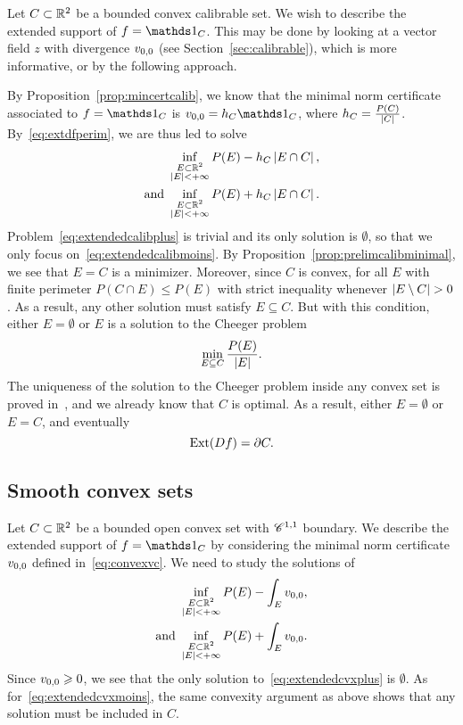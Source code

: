 Let $C\subset \mathbb{R}^2$ be a bounded convex calibrable set. We wish to describe the extended support of $f=\bun{C}$. This may be done by looking at a vector field $z$ with divergence  $v_{0,0}$ (see Section~\ref{sec:calibrable}), which is more informative, or by the following approach.

By Proposition~\ref{prop:mincertcalib}, we know that the minimal norm certificate associated to $f=\bun{C}$ is $\voo=h_C\bun{C}$, where $h_C=\frac{P(C)}{\left| C \right|}$. By~\eqref{eq:extdfperim}, we are thus led to solve
\begin{align}
  \label{eq:extendedcalibmoins}   \inf_{\substack{E\subset\mathbb{R}^2\\\left| E \right|<+\infty}} P(E)-h_C \left| E\cap C \right|,\\
  \label{eq:extendedcalibplus}  \mbox{and } \inf_{\substack{E\subset\mathbb{R}^2\\\left| E \right|<+\infty}} P(E)+h_C \left| E\cap C \right|.
\end{align}
Problem~\eqref{eq:extendedcalibplus} is trivial and its only solution is $\emptyset$, so that we only focus on~\eqref{eq:extendedcalibmoins}. By Proposition~\ref{prop:prelimcalibminimal}, we see that $E=C$ is a minimizer. 
Moreover, since $C$ is convex, for all $E$ with finite perimeter $P(C\cap E)\leq P(E)$ with strict inequality whenever $\abs{E\setminus C}>0$. As a result, any other solution must satisfy $E\subseteq C$. But with this condition, either $E=\emptyset$ or $E$ is a solution to the Cheeger problem
\begin{equation*}
  \min_{E\subseteq C} \frac{P(E)}{\left| E \right|}.
\end{equation*}
The uniqueness of the solution to the Cheeger problem inside any convex set is proved in~\cite{giusti78,alteruniq09}, and we already know that $C$ is optimal. As a result, either $E=\emptyset$ or $E=C$, and eventually
\begin{equation*}
  \operatorname{Ext}(Df)= \partial C.
\end{equation*}

\subsection{Smooth convex sets}\label{sec:ext_smooth}
Let $C\subset\mathbb{R}^2$ be a bounded open convex set with $\mathscr{C}^{1,1}$ boundary. We describe the extended support of $f=\bun{C}$ by considering the minimal norm certificate $v_{0,0}$ defined in~\eqref{eq:convexvc}.
We need to study the solutions of 
\begin{align}
  \label{eq:extendedcvxmoins}   \inf_{\substack{E\subset\mathbb{R}^2\\\left| E \right|<+\infty}} P(E)-\int_E v_{0,0},\\
  \label{eq:extendedcvxplus}  \mbox{and } \inf_{\substack{E\subset\mathbb{R}^2\\\left| E \right|<+\infty}} P(E)+\int_E v_{0,0}.
\end{align}
Since $v_{0,0}\geqslant 0$, we see that the only solution to~\eqref{eq:extendedcvxplus} is $\emptyset$.
As for~\eqref{eq:extendedcvxmoins}, the same convexity argument as above shows that any solution must be included in $C$. 

